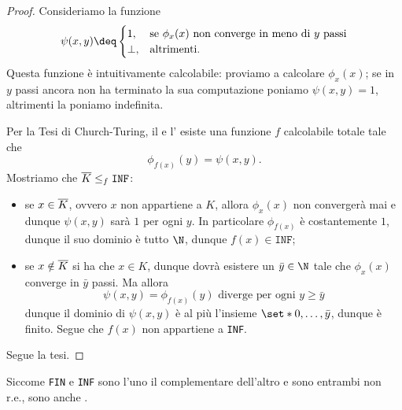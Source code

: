 \begin{proof}
    Consideriamo la funzione \[
        \psi(x, y) \deq \begin{cases}
            1, &\text{se } \phi_x(x) \text{ non converge in meno di $y$ passi}\\
            \bot, &\text{altrimenti.}
        \end{cases}
    \] Questa funzione è intuitivamente calcolabile: proviamo a calcolare $\phi_x(x)$; se in $y$ passi ancora non ha terminato la sua computazione poniamo $\psi(x, y) = 1$, altrimenti la poniamo indefinita.   
    
    Per la Tesi di Church-Turing, il  e l' esiste una funzione $f$ calcolabile totale tale che \[
        \phi_{f(x)}(y) = \psi(x, y).
    \] Mostriamo che $\overline{K} \leq_f \texttt{INF}$: \begin{itemize}
        \item se $x \in \overline{K}$, ovvero $x$ non appartiene a $K$, allora $\phi_x(x)$ non convergerà mai e dunque $\psi(x, y)$ sarà $1$ per ogni $y$. In particolare $\phi_{f(x)}$ è costantemente $1$, dunque il suo dominio è tutto $\N$, dunque $f(x) \in \texttt{INF}$;
        \item se $x \notin \overline{K}$ si ha che $x \in K$, dunque dovrà esistere un $\bar{y} \in \N$ tale che $\phi_x(x)$ converge in $\bar{y}$ passi. Ma allora \[
            \psi(x, y) = \phi_{f(x)}(y) \text{ diverge per ogni } y \geq \bar{y}
        \] dunque il dominio di $\psi(x, y)$ è al più l'insieme $\set*{0, \dots, \bar{y}}$, dunque è finito. Segue che $f(x)$ non appartiene a \texttt{INF}.    
    \end{itemize}
    Segue la tesi.
\end{proof}

\begin{remark}
    Siccome \texttt{FIN} e \texttt{INF} sono l'uno il complementare dell'altro e sono entrambi non r.e., sono anche .
\end{remark}